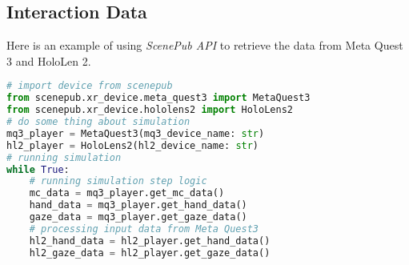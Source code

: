 \subsection{Interaction Data}
\label{app:interaction_data}

Here is an example of using \textit{ScenePub API} to retrieve the data from Meta Quest 3 and HoloLen 2.

\begin{lstlisting}[language=Python]
# import device from scenepub
from scenepub.xr_device.meta_quest3 import MetaQuest3
from scenepub.xr_device.hololens2 import HoloLens2
# do some thing about simulation
mq3_player = MetaQuest3(mq3_device_name: str)
hl2_player = HoloLens2(hl2_device_name: str)
# running simulation
while True:
    # running simulation step logic
    mc_data = mq3_player.get_mc_data()
    hand_data = mq3_player.get_hand_data()
    gaze_data = mq3_player.get_gaze_data()
    # processing input data from Meta Quest3
    hl2_hand_data = hl2_player.get_hand_data()
    hl2_gaze_data = hl2_player.get_gaze_data()
\end{lstlisting}

